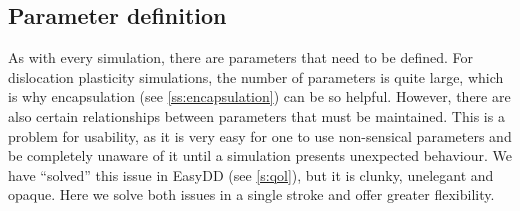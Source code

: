\subsection{Parameter definition}

As with every simulation, there are parameters that need to be defined. For dislocation plasticity simulations, the number of parameters is quite large, which is why encapsulation (see \cref{ss:encapsulation}) can be so helpful. However, there are also certain relationships between parameters that must be maintained. This is a problem for usability, as it is very easy for one to use non-sensical parameters and be completely unaware of it until a simulation presents unexpected behaviour. We have ``solved'' this issue in EasyDD (see \cref{s:qol}), but it is clunky, unelegant and opaque. Here we solve both issues in a single stroke and offer greater flexibility.

